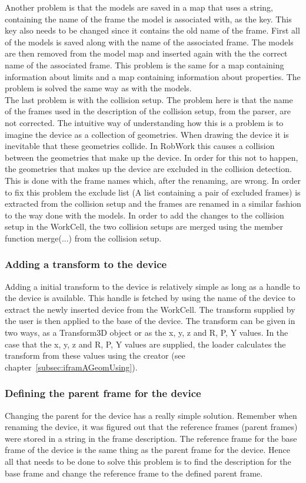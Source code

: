 Another problem is that the models are saved in a map that uses a string, containing the name of the frame the model is associated with, as the key. This key also needs to be changed since it contains the old name of the frame. First all of the models is saved along with the name of the associated frame. The models are then removed from the model map and inserted again with the the correct name of the associated frame. This problem is the same for a map containing information about limits and a map containing information about properties. The problem is solved the same way as with the models.\\

The last problem is with the collision setup. The problem here is that the name of the frames used in the description of the collision setup, from the parser, are not corrected. The intuitive way of understanding how this is a problem is to imagine the device as a collection of geometries. When drawing the device it is inevitable that these geometries collide. In RobWork this causes a collision between the geometries that make up the device. In order for this not to happen, the geometries that makes up the device are excluded in the collision detection. This is done with the frame names which, after the renaming, are wrong. In order to fix this problem the exclude list (A list containing a pair of excluded frames) is extracted from the collision setup and the frames are renamed in a similar fashion to the way done with the models. In order to add the changes to the collision setup in the WorkCell, the two collision setups are merged using the member function merge(...) from the collision setup.

\subsubsection{Adding a transform to the device}
Adding a initial transform to the device is relatively simple as long as a handle to the device is available. This handle is fetched by using the name of the device to extract the newly inserted device from the WorkCell. The transform supplied by the user is then applied to the base of the device. The transform can be given in two ways, as a Transform3D object or as the x, y, z and R, P, Y values. In the case that the x, y, z and R, P, Y values are supplied, the loader calculates the transform from these values using the creator (see chapter~\ref{subsec:iframAGeomUsing}).

\subsubsection{Defining the parent frame for the device}
Changing the parent for the device has a really simple solution. Remember when renaming the device, it was figured out that the reference frames (parent frames) were stored in a string in the frame description. The reference frame for the base frame of the device is the same thing as the parent frame for the device. Hence all that needs to be done to solve this problem is to find the description for the base frame and change the reference frame to the defined parent frame.



